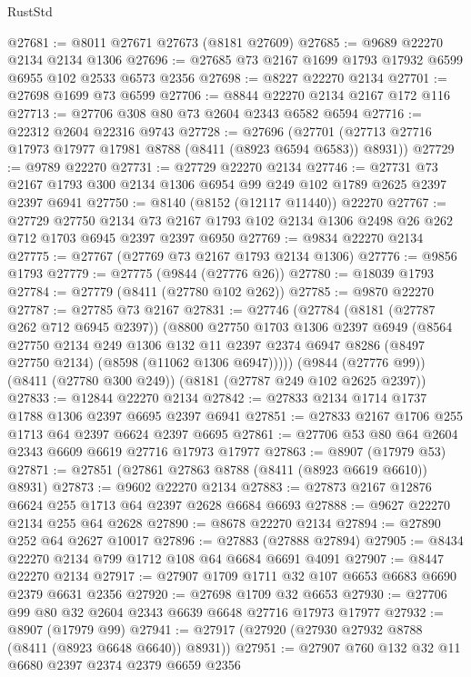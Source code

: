 \begin{lexlean}{RustStd}
\begin{coremodule}
@27681 := @8011 @27671 @27673 (@8181 @27609)
@27685 := @9689 @22270 @2134 @2134 @1306
@27696 := @27685 @73 @2167 @1699 @1793 @17932 @6599 @6955 @102 @2533 @6573 @2356
@27698 := @8227 @22270 @2134
@27701 := @27698 @1699 @73 @6599
@27706 := @8844 @22270 @2134 @2167 @172 @116
@27713 := @27706 @308 @80 @73 @2604 @2343 @6582 @6594
@27716 := @22312 @2604 @22316 @9743
@27728 := @27696
    (@27701 (@27713 @27716 @17973 @17977 @17981 @8788 (@8411 (@8923 @6594 @6583)) @8931))
@27729 := @9789 @22270
@27731 := @27729 @22270 @2134
@27746 := @27731 @73 @2167 @1793 @300 @2134 @1306 @6954 @99 @249 @102 @1789 @2625 @2397 @2397 @6941
@27750 := @8140 (@8152 (@12117 @11440)) @22270
@27767 := @27729
    @27750
    @2134
    @73
    @2167
    @1793
    @102
    @2134
    @1306
    @2498
    @26
    @262
    @712
    @1703
    @6945
    @2397
    @2397
    @6950
@27769 := @9834 @22270 @2134
@27775 := @27767 (@27769 @73 @2167 @1793 @2134 @1306)
@27776 := @9856 @1793
@27779 := @27775 (@9844 (@27776 @26))
@27780 := @18039 @1793
@27784 := @27779 (@8411 (@27780 @102 @262))
@27785 := @9870 @22270
@27787 := @27785 @73 @2167
@27831 := @27746
    (@27784
      (@8181 (@27787 @262 @712 @6945 @2397))
      (@8800
        @27750
        @1703
        @1306
        @2397
        @6949
        (@8564
          @27750
          @2134
          @249
          @1306
          @132
          @11
          @2397
          @2374
          @6947
          @8286
          (@8497 @27750 @2134)
          (@8598 (@11062 @1306 @6947)))))
    (@9844 (@27776 @99))
    (@8411 (@27780 @300 @249))
    (@8181 (@27787 @249 @102 @2625 @2397))
@27833 := @12844 @22270 @2134
@27842 := @27833 @2134 @1714 @1737 @1788 @1306 @2397 @6695 @2397 @6941
@27851 := @27833 @2167 @1706 @255 @1713 @64 @2397 @6624 @2397 @6695
@27861 := @27706 @53 @80 @64 @2604 @2343 @6609 @6619 @27716 @17973 @17977
@27863 := @8907 (@17979 @53)
@27871 := @27851 (@27861 @27863 @8788 (@8411 (@8923 @6619 @6610)) @8931)
@27873 := @9602 @22270 @2134
@27883 := @27873 @2167 @12876 @6624 @255 @1713 @64 @2397 @2628 @6684 @6693
@27888 := @9627 @22270 @2134 @255 @64 @2628
@27890 := @8678 @22270 @2134
@27894 := @27890 @252 @64 @2627 @10017
@27896 := @27883 (@27888 @27894)
@27905 := @8434 @22270 @2134 @799 @1712 @108 @64 @6684 @6691 @4091
@27907 := @8447 @22270 @2134
@27917 := @27907 @1709 @1711 @32 @107 @6653 @6683 @6690 @2379 @6631 @2356
@27920 := @27698 @1709 @32 @6653
@27930 := @27706 @99 @80 @32 @2604 @2343 @6639 @6648 @27716 @17973 @17977
@27932 := @8907 (@17979 @99)
@27941 := @27917 (@27920 (@27930 @27932 @8788 (@8411 (@8923 @6648 @6640)) @8931))
@27951 := @27907 @760 @132 @32 @11 @6680 @2397 @2374 @2379 @6659 @2356

\end{coremodule}
\end{lexlean}
